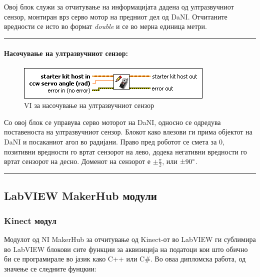 \documentclass[11pt]{article}
\begin{document}
        Овој блок служи за отчитување на информацијата дадена од ултразвучниот сензор, монтиран врз серво мотор на предниот дел од DaNI. Отчитаните вредности се исто во формат \textit{double} и се во мерна единица метри.\\
        \textcolor[RGB]{150,150,150}{\rule{\linewidth}{1.6pt}}

    \paragraph{Насочување на ултразвучниот сензор:\\}
    	\begin{figure}[H]
				\includegraphics[width=0.55\linewidth]{./images/write_servo.png}
				\caption{VI за насочување на ултразвучниот сензор}
				\label{fig:write_servo.png}
				\raggedright
				\end{figure}

      Со овој блок се управува серво моторот на DaNI, односно се одредува поставеноста на ултразвучниот сензор. Блокот како влезови ги прима објектот на DaNI и посаканиот агол во радијани. Право пред роботот се смета за 0, позитивни вредности го вртат сензорот на лево, додека негативни вредности го вртат сензорот на десно. Доменот на сензорот е $ \pm \frac{\pi}{2}$, или $\pm 90 \degree$.\\
      \textcolor[RGB]{150,150,150}{\rule{\linewidth}{1.6pt}}

  \subsection{LabVIEW MakerHub модули}
    \subsubsection{Kinect модул}
      Модулот од NI MakerHub за отчитување од Kinect-от во LabVIEW ги сублимира во LabVIEW блокови сите функции за аквизиција на податоци кои што обично би се програмирале во јазик како C++ или C\#. Во оваа дипломска работа, од значење се следните фунцкии:
\end{document}
